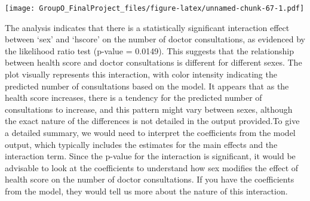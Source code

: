 \documentclass[
]{article}
\newenvironment{Shaded}{\begin{snugshade}}{\end{snugshade}}
\newcommand{\AttributeTok}[1]{\textcolor[rgb]{0.13,0.29,0.53}{#1}}
\newcommand{\CommentTok}[1]{\textcolor[rgb]{0.56,0.35,0.01}{\textit{#1}}}
\newcommand{\FunctionTok}[1]{\textcolor[rgb]{0.13,0.29,0.53}{\textbf{#1}}}
\newcommand{\NormalTok}[1]{#1}
\newcommand{\OtherTok}[1]{\textcolor[rgb]{0.56,0.35,0.01}{#1}}
\newcommand{\SpecialCharTok}[1]{\textcolor[rgb]{0.81,0.36,0.00}{\textbf{#1}}}
\newcommand{\StringTok}[1]{\textcolor[rgb]{0.31,0.60,0.02}{#1}}
\begin{document}
\begin{Shaded}
\end{Shaded}

\texttt{[image: GroupO\_FinalProject\_files/figure-latex/unnamed-chunk-67-1.pdf]}

The analysis indicates that there is a statistically significant
interaction effect between `sex' and `hscore' on the number of doctor
consultations, as evidenced by the likelihood ratio test (p-value =
0.0149). This suggests that the relationship between health score and
doctor consultations is different for different sexes. The plot visually
represents this interaction, with color intensity indicating the
predicted number of consultations based on the model. It appears that as
the health score increases, there is a tendency for the predicted number
of consultations to increase, and this pattern might vary between sexes,
although the exact nature of the differences is not detailed in the
output provided.To give a detailed summary, we would need to interpret
the coefficients from the model output, which typically includes the
estimates for the main effects and the interaction term. Since the
p-value for the interaction is significant, it would be advisable to
look at the coefficients to understand how sex modifies the effect of
health score on the number of doctor consultations. If you have the
coefficients from the model, they would tell us more about the nature of
this interaction.
\end{document}
